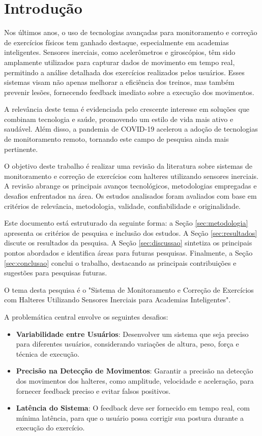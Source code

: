 \documentclass[conference]{IEEEtran}
\begin{document}
\section{Introdução}

Nos últimos anos, o uso de tecnologias avançadas para monitoramento e correção de exercícios físicos tem ganhado destaque, especialmente em academias inteligentes. Sensores inerciais, como acelerômetros e giroscópios, têm sido amplamente utilizados para capturar dados de movimento em tempo real, permitindo a análise detalhada dos exercícios realizados pelos usuários. Esses sistemas visam não apenas melhorar a eficiência dos treinos, mas também prevenir lesões, fornecendo feedback imediato sobre a execução dos movimentos.

A relevância deste tema é evidenciada pelo crescente interesse em soluções que combinam tecnologia e saúde, promovendo um estilo de vida mais ativo e saudável. Além disso, a pandemia de COVID-19 acelerou a adoção de tecnologias de monitoramento remoto, tornando este campo de pesquisa ainda mais pertinente.

O objetivo deste trabalho é realizar uma revisão da literatura sobre sistemas de monitoramento e correção de exercícios com halteres utilizando sensores inerciais. A revisão abrange os principais avanços tecnológicos, metodologias empregadas e desafios enfrentados na área. Os estudos analisados foram avaliados com base em critérios de relevância, metodologia, validade, confiabilidade e originalidade.

Este documento está estruturado da seguinte forma: a Seção \ref{sec:metodologia} apresenta os critérios de pesquisa e inclusão dos estudos. A Seção \ref{sec:resultados} discute os resultados da pesquisa. A Seção \ref{sec:discussao} sintetiza os principais pontos abordados e identifica áreas para futuras pesquisas. Finalmente, a Seção \ref{sec:conclusao} conclui o trabalho, destacando as principais contribuições e sugestões para pesquisas futuras.

O tema desta pesquisa é o "Sistema de Monitoramento e Correção de Exercícios com Halteres Utilizando Sensores Inerciais para Academias Inteligentes". 

A problemática central envolve os seguintes desafios:
\begin{itemize}
    \item \textbf{Variabilidade entre Usuários}: Desenvolver um sistema que seja preciso para diferentes usuários, considerando variações de altura, peso, força e técnica de execução.
    \item \textbf{Precisão na Detecção de Movimentos}: Garantir a precisão na detecção dos movimentos dos halteres, como amplitude, velocidade e aceleração, para fornecer feedback preciso e evitar falsos positivos.
    \item \textbf{Latência do Sistema}: O feedback deve ser fornecido em tempo real, com mínima latência, para que o usuário possa corrigir sua postura durante a execução do exercício.
\end{itemize}
\end{document}

